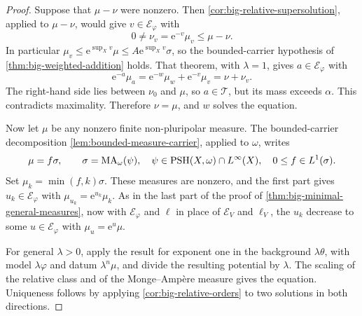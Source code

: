 \begin{proof}
Suppose that $\mu-\nu$ were nonzero. Then \cref{cor:big-relative-supersolution}, applied to $\mu-\nu$, would give $v\in\mathcal E_\varphi$ with
\[
 0\ne\nu_v=\mathrm{e}^{-v}\mu_v\leq\mu-\nu.
\]
In particular $\mu_v\leq \mathrm{e}^{\sup_Xv}\mu\leq A \mathrm{e}^{\sup_Xv}\sigma$, so the bounded-carrier hypothesis of \cref{thm:big-weighted-addition} holds. That theorem, with $\lambda=1$, gives $a\in\mathcal E_\varphi$ with
\[
 \mathrm{e}^{-a}\mu_a=\mathrm{e}^{-w}\mu_w+\mathrm{e}^{-v}\mu_v=\nu+\nu_v.
\]
The right-hand side lies between $\nu_0$ and $\mu$, so $a\in\mathcal T$, but its mass exceeds $\alpha$. This contradicts maximality. Therefore $\nu=\mu$, and $w$ solves the equation.

Now let $\mu$ be any nonzero finite non-pluripolar measure. The bounded-carrier decomposition \cref{lem:bounded-measure-carrier}, applied to $\omega$, writes
\[
 \mu=f\sigma,\qquad
 \sigma=\mathrm{MA}_\omega(\psi),\quad
 \psi\in\mathrm{PSH}(X,\omega)\cap L^\infty(X),\quad
 0\leq f\in L^1(\sigma).
\]
Set $\mu_k=\min(f,k)\sigma$. These measures are nonzero, and the first part gives $u_k\in\mathcal E_\varphi$ with $\mu_{u_k}=\mathrm{e}^{u_k}\mu_k$. As in the last part of the proof of \cref{thm:big-minimal-general-measures}, now with $\mathcal E_\varphi$ and $\ell$ in place of $\mathcal E_V$ and $\ell_V$, the $u_k$ decrease to some $u\in\mathcal E_\varphi$ with $\mu_u=\mathrm{e}^u\mu$.

For general $\lambda>0$, apply the result for exponent one in the background $\lambda\theta$, with model $\lambda\varphi$ and datum $\lambda^n\mu$, and divide the resulting potential by $\lambda$. The scaling of the relative class and of the Monge--Amp\`ere measure gives the equation. Uniqueness follows by applying \cref{cor:big-relative-orders} to two solutions in both directions.
\end{proof}

